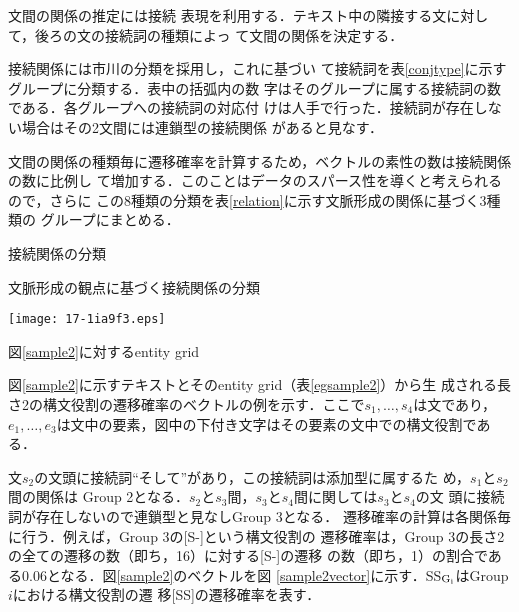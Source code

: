 \documentclass[japanese]{jnlp_1.4}
\newcommand{\figcaption}[1]{}
\begin{document}
  文間の関係の推定には接続
  表現を利用する．テキスト中の隣接する文に対して，後ろの文の接続詞の種類によっ
  て文間の関係を決定する．

  接続関係には市川の分類\cite{itikawa1978}を採用し，これに基づい
  て接続詞を表\ref{conjtype}に示すグループに分類する．表中の括弧内の数
  字はそのグループに属する接続詞の数である．各グループへの接続詞の対応付
  けは人手で行った．接続詞が存在しない場合はその2文間には連鎖型の接続関係
  があると見なす．

  文間の関係の種類毎に遷移確率を計算するため，ベクトルの素性の数は接続関係の数に比例し
  て増加する．このことはデータのスパース性を導くと考えられるので，さらに
  この8種類の分類を表\ref{relation}に示す文脈形成の関係に基づく3種類の
  グループにまとめる．

  \begin{table}[b]
     \caption{接続関係の分類}\label{conjtype}

\end{table}
\begin{table}[b]
  \caption{文脈形成の観点に基づく接続関係の分類}\label{relation}

\end{table}
  \begin{table}[b]
   \begin{minipage}[t]{.5\textwidth}
    \begin{center}
\texttt{[image: 17-1ia9f3.eps]}
    \end{center}
    \figcaption{テキスト例2}\label{sample2}
   \end{minipage}
   \hfill
   \begin{minipage}[t]{.45\textwidth}
    \caption{図\ref{sample2}に対するentity grid}
\label{egsample2}

   \end{minipage}
  \end{table}


図\ref{sample2}に示すテキストとそのentity grid（表\ref{egsample2}）から生
成される長さ2の構文役割の遷移確率のベクトルの例を示す．ここで$s_1, \dots , s_4$は文であり，
$e_1, \dots , e_3$は文中の要素，図中の下付き文字はその要素の文中での構文役割であ
る．

  文$s_2$の文頭に接続詞``そして''があり，この接続詞は添加型に属するた
  め，$s_1$と$s_2$間の関係は
  Group 2となる．$s_2$と$s_3$間，$s_3$と$s_4$間に関しては$s_3$と$s_4$の文
  頭に接続詞が存在しないので連鎖型と見なしGroup 3となる．
  遷移確率の計算は各関係毎に行う．例えば，Group 3の[S-]という構文役割の
  遷移確率は，Group 3の長さ2の全ての遷移の数（即ち，16）に対する[S-]の遷移
  の数（即ち，1）の割合である0.06となる．図\ref{sample2}のベクトルを図
  \ref{sample2vector}に示す．SS$_{\rm G_i}$はGroup $i$における構文役割の遷
  移[SS]の遷移確率を表す．
\end{document}
